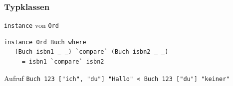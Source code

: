 \documentclass[fleqn,11pt,aspectratio=43]{beamer}
\begin{document}
\begin{frame}[fragile]
\frametitle{Typklassen}
\begin{block}{\lstinline|instance| von \lstinline|Ord|}
\begin{lstlisting}
instance Ord Buch where
   (Buch isbn1 _ _) `compare` (Buch isbn2 _ _) 
     = isbn1 `compare` isbn2
\end{lstlisting}
\end{block}
\begin{block}{Aufruf}
\lstinline|Buch 123 ["ich", "du"] "Hallo" < Buch 123 ["du"] "keiner"|
\end{block}
\end{frame}


\end{document}
